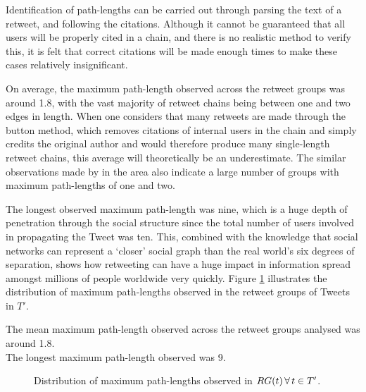 Identification of path-lengths can be carried out through parsing the text of a retweet, and following the citations. Although it cannot be guaranteed that all users will be properly cited in a chain, and there is no realistic method to verify this, it is felt that correct citations will be made enough times to make these cases relatively insignificant.

On average, the maximum path-length observed across the retweet groups was around 1.8, with the vast majority of retweet chains being between one and two edges in length. When one considers that many retweets are made through the button method, which removes citations of internal users in the chain and simply credits the original author and would therefore produce many single-length retweet chains, this average will theoretically be an underestimate. The similar observations made by \citet{kwak10} in the area also indicate a large number of groups with maximum path-lengths of one and two.

The longest observed maximum path-length was nine, which is a huge depth of penetration through the social structure since the total number of users involved in propagating the Tweet was ten. This, combined with the knowledge that social networks can represent a `closer' social graph than the real world's six degrees of separation, shows how retweeting can have a huge impact in information spread amongst millions of people worldwide very quickly. Figure \ref{fig:pathlength-distribution} illustrates the distribution of maximum path-lengths observed in the retweet groups of Tweets in $T'$.

\begin{myobservation}
\label{observation:path-length}
The mean maximum path-length observed across the retweet groups analysed was around 1.8.\\
The longest maximum path-length observed was 9.
\end{myobservation}

\begin{figure}[h]
\centering
    \caption{Distribution of maximum path-lengths observed in $RG(t) \, \forall \, t \in T'$.}
    \label{fig:pathlength-distribution}
\end{figure}

